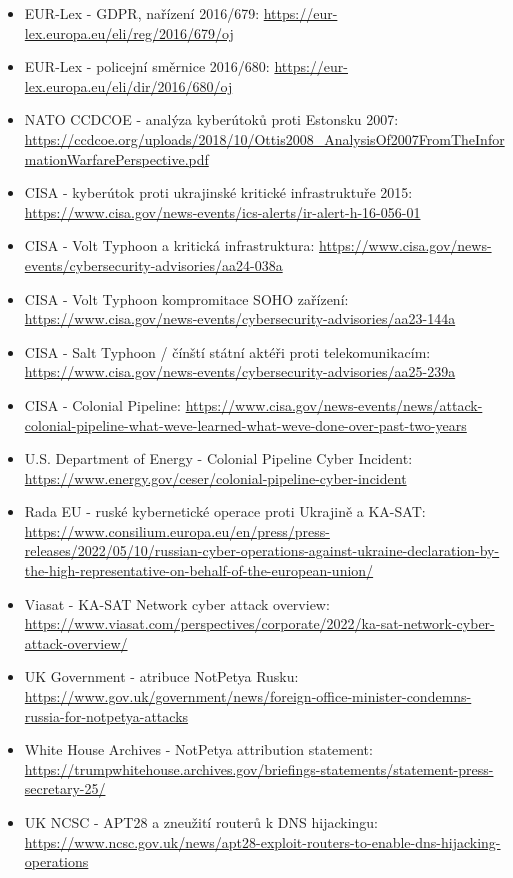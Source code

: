 \begin{itemize}
  \item EUR-Lex - GDPR, nařízení 2016/679: \url{https://eur-lex.europa.eu/eli/reg/2016/679/oj}
  \item EUR-Lex - policejní směrnice 2016/680: \url{https://eur-lex.europa.eu/eli/dir/2016/680/oj}
  \item NATO CCDCOE - analýza kyberútoků proti Estonsku 2007: \url{https://ccdcoe.org/uploads/2018/10/Ottis2008_AnalysisOf2007FromTheInformationWarfarePerspective.pdf}
  \item CISA - kyberútok proti ukrajinské kritické infrastruktuře 2015: \url{https://www.cisa.gov/news-events/ics-alerts/ir-alert-h-16-056-01}
  \item CISA - Volt Typhoon a kritická infrastruktura: \url{https://www.cisa.gov/news-events/cybersecurity-advisories/aa24-038a}
  \item CISA - Volt Typhoon kompromitace SOHO zařízení: \url{https://www.cisa.gov/news-events/cybersecurity-advisories/aa23-144a}
  \item CISA - Salt Typhoon / čínští státní aktéři proti telekomunikacím: \url{https://www.cisa.gov/news-events/cybersecurity-advisories/aa25-239a}
  \item CISA - Colonial Pipeline: \url{https://www.cisa.gov/news-events/news/attack-colonial-pipeline-what-weve-learned-what-weve-done-over-past-two-years}
  \item U.S. Department of Energy - Colonial Pipeline Cyber Incident: \url{https://www.energy.gov/ceser/colonial-pipeline-cyber-incident}
  \item Rada EU - ruské kybernetické operace proti Ukrajině a KA-SAT: \url{https://www.consilium.europa.eu/en/press/press-releases/2022/05/10/russian-cyber-operations-against-ukraine-declaration-by-the-high-representative-on-behalf-of-the-european-union/}
  \item Viasat - KA-SAT Network cyber attack overview: \url{https://www.viasat.com/perspectives/corporate/2022/ka-sat-network-cyber-attack-overview/}
  \item UK Government - atribuce NotPetya Rusku: \url{https://www.gov.uk/government/news/foreign-office-minister-condemns-russia-for-notpetya-attacks}
  \item White House Archives - NotPetya attribution statement: \url{https://trumpwhitehouse.archives.gov/briefings-statements/statement-press-secretary-25/}
  \item UK NCSC - APT28 a zneužití routerů k DNS hijackingu: \url{https://www.ncsc.gov.uk/news/apt28-exploit-routers-to-enable-dns-hijacking-operations}

\end{itemize}
